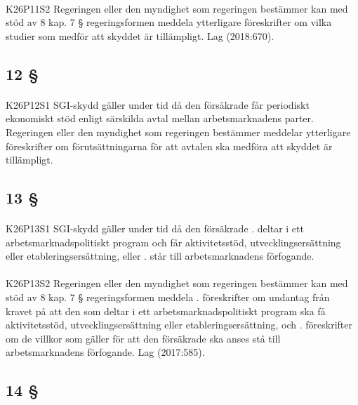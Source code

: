 \documentclass[a4paper,notitlepage,openany,10pt]{book}
\begin{document}
\paragraph*{}
{\tiny K26P11S2}
Regeringen eller den myndighet som regeringen bestämmer kan med stöd av 8 kap. 7 § regeringsformen meddela ytterligare föreskrifter om vilka studier som medför att skyddet är tillämpligt.
Lag (2018:670).
\subsection*{12 §}
\paragraph*{}
{\tiny K26P12S1}
SGI-skydd gäller under tid då den försäkrade får periodiskt ekonomiskt stöd enligt särskilda avtal mellan arbetsmarknadens parter. Regeringen eller den myndighet som regeringen bestämmer meddelar ytterligare föreskrifter om förutsättningarna för att avtalen ska medföra att skyddet är tillämpligt.
\subsection*{13 §}
\paragraph*{}
{\tiny K26P13S1}
SGI-skydd gäller under tid då den försäkrade
. deltar i ett arbetsmarknadspolitiskt program och får aktivitetsstöd, utvecklingsersättning eller etableringsersättning, eller
. står till arbetsmarknadens förfogande.
\paragraph*{}
{\tiny K26P13S2}
Regeringen eller den myndighet som regeringen bestämmer kan med stöd av 8 kap. 7 § regeringsformen meddela
. föreskrifter om undantag från kravet på att den som deltar i ett arbetsmarknadspolitiskt program ska få aktivitetsstöd, utvecklingsersättning eller etableringsersättning, och
. föreskrifter om de villkor som gäller för att den försäkrade ska anses stå till arbetsmarknadens förfogande.
Lag (2017:585).
\subsection*{14 §}
\end{document}
